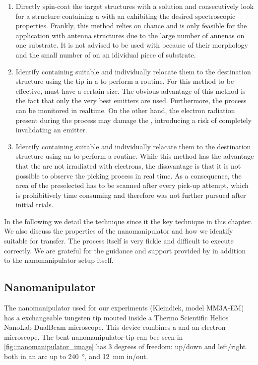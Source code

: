 	\begin{enumerate}
		\item Directly spin-coat the target structures with a \nd solution and consecutively look for a structure containing a \nd with an \siv exhibiting the desired spectroscopic properties. Frankly, this method relies on chance and is only feasible for the application with antenna structures due to the large number of annenas on one substrate. It is not advised to be used with \VCSELs because of their morphology and the small number of \VCSELs on an idividual piece of substrate.

		\item Identify \nds containing suitable \sivs and individually relocate them to the destination structure using the tip in a \sem to perform a \pp routine. For this method to be effective, \nds must have a certain size. The obvious advantage of this method is the fact that only the very best emitters are used. Furthermore, the \pp process can be monitored in realtime. On the other hand, the electron radiation present during the \pp process may damage the \siv, introducing a risk of completely invalidating an emitter.

		\item Identify \nds containing suitable \sivs and individually relacate them to the destination structure using an \afm to perform a \pp routine. While this method has the advantage that the \nds are not irradiated with electrons, the disavantage is that it is not possible to  observe the picking process in real time. As a consequence, the area of the preselected \nd has to be scanned after every pick-up attempt, which is prohibitively time consuming and therefore was not further pursued after initial trials.
	\end{enumerate}

		In the following we detail the \pp technique since it the key technique in this chapter. We also discuss the properties of the nanomanipulator and how we identify \nds suitable for \pp transfer. The \pp process itself is very fickle and difficult to execute correctly. We are grateful for the guidance and support provided by \pauly in addition to the nanomanipulator setup itself.
		\\
	\subsection{Nanomanipulator} \label{subsec::nanomanipulator}

		The nanomanipulator used for our experiments (Kleindiek, model MM3A-EM) has a exchangeable tungsten tip
	  mouted inside a Thermo Scientific\texttrademark{} Helios NanoLab\texttrademark{} DualBeam\texttrademark{} microscope. This device combines a \fib and an electron microscope.
		The bent nanomanipulator tip can bee seen in \autoref{fig::nanomanipulator_image} has $3$ degrees of freedom: up/down and left/right both in an arc up to \SI{240}{\degree}, and \SI{12}{\milli\metre} in/out.

